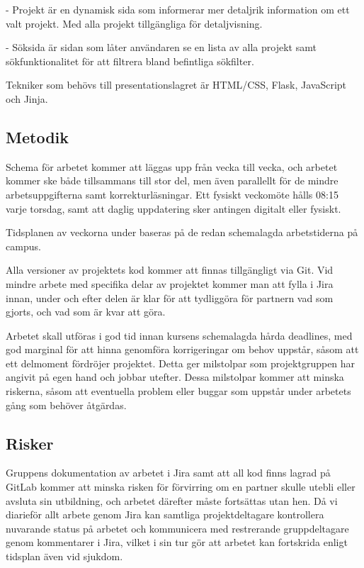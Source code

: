 \documentclass{TDP003mall}
\begin{document}
- Projekt är en dynamisk sida som informerar mer detaljrik information om ett valt projekt. Med alla projekt tillgängliga för detaljvisning.

- Söksida är sidan som låter användaren se en lista av alla projekt samt sökfunktionalitet för att filtrera bland befintliga sökfilter.

Tekniker som behövs till presentationslagret är HTML/CSS, Flask, JavaScript och Jinja.

\subsection*{Metodik}
%
 Schema för arbetet kommer att läggas upp från vecka till vecka, och arbetet kommer ske både tillsammans till stor del, men även parallellt för de mindre arbetsuppgifterna samt korrekturläsningar. Ett fysiskt veckomöte hålls 08:15 varje torsdag, samt att daglig uppdatering sker antingen digitalt eller fysiskt.

 Tidsplanen av veckorna under baseras på de redan schemalagda arbetstiderna på campus.

 Alla versioner av projektets kod kommer att finnas tillgängligt via Git. Vid mindre arbete med specifika delar av projektet kommer man att fylla i Jira innan, under och efter delen är klar för att tydliggöra för partnern vad som gjorts, och vad som är kvar att göra.

 Arbetet skall utföras i god tid innan kursens schemalagda hårda deadlines, med god marginal för att hinna genomföra korrigeringar om behov uppstår, såsom att ett delmoment fördröjer projektet. Detta ger milstolpar som projektgruppen har angivit på egen hand och jobbar utefter. Dessa milstolpar kommer att minska riskerna, såsom att eventuella problem eller buggar som uppstår under arbetets gång som behöver åtgärdas.

 \subsection*{Risker}
 Gruppens dokumentation av arbetet i Jira samt att all kod finns lagrad på GitLab kommer att minska risken för förvirring om en partner skulle utebli eller avsluta sin utbildning, och arbetet därefter måste fortsättas utan hen. Då vi diarieför allt arbete genom Jira kan samtliga projektdeltagare kontrollera nuvarande status på arbetet och kommunicera med restrerande gruppdeltagare genom kommentarer i Jira, vilket i sin tur gör att arbetet kan fortskrida enligt tidsplan även vid sjukdom.
\end{document}
